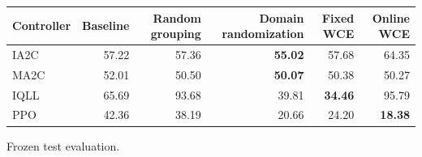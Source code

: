 \begin{tabular}{lrrrrr}
\hline
Controller & Baseline & Random grouping & Domain randomization & Fixed WCE & Online WCE \\
\hline
IA2C & 57.22 & 57.36 & \textbf{55.02} & 57.68 & 64.35 \\
MA2C & 52.01 & 50.50 & \textbf{50.07} & 50.38 & 50.27 \\
IQLL & 65.69 & 93.68 & 39.81 & \textbf{34.46} & 95.79 \\
PPO & 42.36 & 38.19 & 20.66 & 24.20 & \textbf{18.38} \\
\hline
\end{tabular}
Frozen test evaluation.
